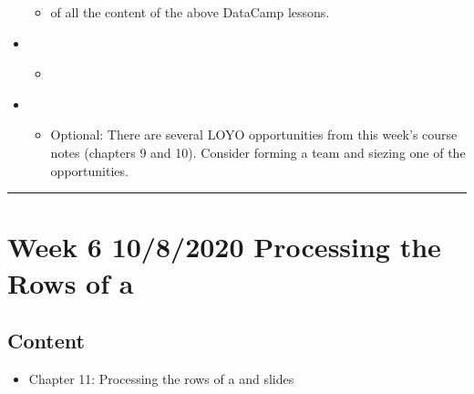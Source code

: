 \documentclass[letterpaper,10pt,english]{sphinxmanual}
\begin{document}
\begin{itemize}
\begin{itemize}
\begin{itemize}
\end{itemize}

\item {} 
 of all the content of the above DataCamp lessons.

\end{itemize}

\item {} 
\begin{itemize}
\item {} 
{\hyperref[\detokenize{chapter-11-processing-rows::doc}]{}}

\end{itemize}

\item {} 
\begin{itemize}
\item {} 
Optional: There are several LOYO opportunities from this week’s course notes (chapters 9 and 10).  Consider forming a team and siezing one of the opportunities.

\end{itemize}

\end{itemize}


\bigskip\hrule\bigskip



\section{Week 6 \sphinxhyphen{} 10/8/2020 \sphinxhyphen{} Processing the Rows of a }
\label{\detokenize{course-schedule:week-6-10-8-2020-processing-the-rows-of-a-dataframe}}

\subsection{Content}
\label{\detokenize{course-schedule:id9}}\begin{itemize}
\item {} 
Chapter 11: Processing the rows of a  \sphinxhyphen{} {\hyperref[\detokenize{chapter-11-processing-rows::doc}]{}} and slides

\end{itemize}
\end{document}
